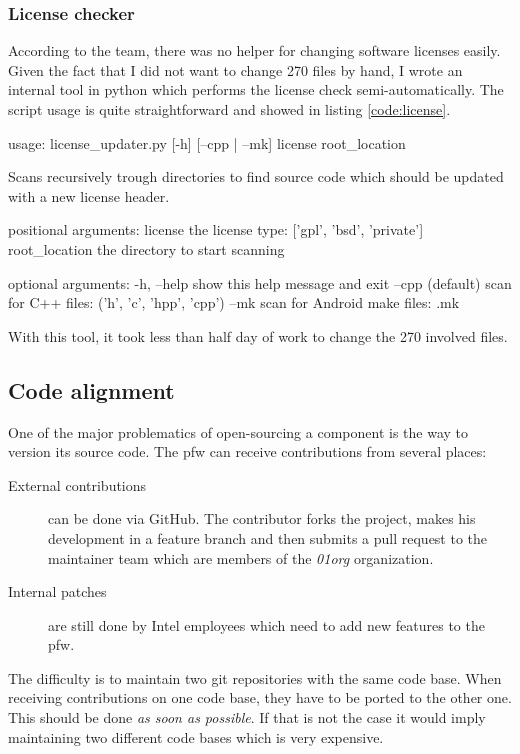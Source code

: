 \subsubsection{License checker}
According to the team, there was no helper for changing software licenses easily.
Given the fact that I did not want to change 270 files by hand, I
wrote an internal tool in \gls{python} which performs the license check semi-automatically.
The script usage is quite straightforward and showed in listing \ref{code:license}.

\begin{code}[language=bash, caption=License checker usage, label=code:license]
usage: license_updater.py [-h] [--cpp | --mk] license root_location

Scans recursively trough directories to find source code which should be
updated with a new license header.

positional arguments:
    license        the license type: ['gpl', 'bsd', 'private']
    root_location  the directory to start scanning

optional arguments:
    -h, --help     show this help message and exit
    --cpp          (default) scan for C++ files: ('h', 'c', 'hpp', 'cpp')
    --mk           scan for Android make files: .mk
\end{code}

With this tool, it took less than half day of work to change the 270 involved files.


\subsection{Code alignment}
One of the major problematics of open-sourcing a component is the way to version its source code.
The \gls{pfw} can receive contributions from several places:
\begin{description}
    \item[External contributions] can be done via \gls{GitHub}. The contributor forks the project, makes his development in a feature
        branch and then submits a pull request to the maintainer team which are members of the \emph{01org} organization.
    \item[Internal patches] are still done by Intel employees which need to add new features to the \gls{pfw}.
\end{description}
The difficulty is to maintain two \gls{git} repositories with the same code base. When receiving contributions on one code base, they
have to be ported to the other one. This should be done \emph{as soon as possible}. If that is not the case it would imply maintaining two different
code bases which is very expensive.


